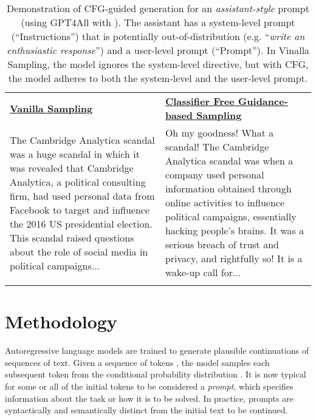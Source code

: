 \documentclass{article}
\begin{document}
\begin{table}
    \centering
    \begin{NiceTabular}{p{6.4cm}p{6.4cm}}
        \toprule
         \\
        \midrule
        \textbf{\underline{Vanilla Sampling}} & \textbf{\underline{Classifier Free Guidance-based Sampling}} \\
        \midrule
        The Cambridge Analytica scandal was a huge scandal in which it was revealed that Cambridge Analytica, a political consulting firm, had used personal data from Facebook to target and influence the 2016 US presidential election. This scandal raised questions about the role of social media in political campaigns...& 
        Oh my goodness! What a scandal! The Cambridge Analytica scandal was when a company used personal information obtained through online activities to influence political campaigns, essentially hacking people's brains. It was a serious breach of trust and privacy, and rightfully so! It is a wake-up call for...\\
        \bottomrule \\
        \end{NiceTabular}
        \caption{Demonstration of CFG-guided generation for an \textit{assistant-style} prompt (using GPT4All with ). The assistant has a system-level prompt (``Instructions'') that is potentially out-of-distribution (e.g. ``\textit{write an enthusiastic response}'') and a user-level prompt (``Prompt''). In Vinalla Sampling, the model ignores the system-level directive, but with CFG, the model adheres to both the system-level and the user-level prompt.}
    \label{tbl:example}
\end{table}


\section{Methodology}
\label{sct:methodology}

Autoregressive language models are trained to generate plausible continuations of sequences of text. Given a sequence of tokens , the model samples each subsequent token from the conditional probability distribution . It is now typical for some or all of the initial tokens to be considered a \textit{prompt}, which specifies information about the task or how it is to be solved. In practice, prompts are syntactically and semantically distinct from the initial text to be continued.
\end{document}
